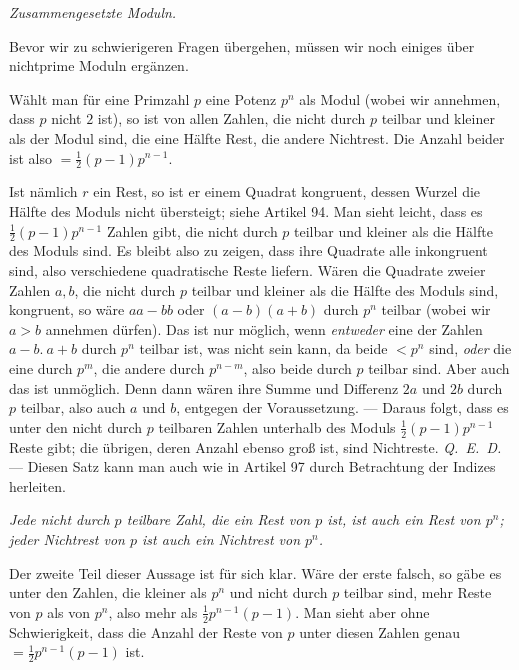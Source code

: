 \begin{center}\small\emph{Zusammengesetzte Moduln.}\end{center}

Bevor wir zu schwierigeren Fragen übergehen, müssen wir noch einiges über nichtprime Moduln ergänzen.

Wählt man für eine Primzahl $p$ eine Potenz $p^n$ als Modul (wobei wir annehmen, dass $p$ nicht $2$ ist), so ist von allen Zahlen, die nicht durch $p$ teilbar und kleiner als der Modul sind, die eine Hälfte Rest, die andere Nichtrest. Die Anzahl beider ist also $=\tfrac12(p-1)p^{n-1}$.

Ist nämlich $r$ ein Rest, so ist er einem Quadrat kongruent, dessen Wurzel die Hälfte des Moduls nicht übersteigt; siehe Artikel 94. Man sieht leicht, dass es $\tfrac12(p-1)p^{n-1}$ Zahlen gibt, die nicht durch $p$ teilbar und kleiner als die Hälfte des Moduls sind. Es bleibt also zu zeigen, dass ihre Quadrate alle inkongruent sind, also verschiedene quadratische Reste liefern. Wären die Quadrate zweier Zahlen $a,b$, die nicht durch $p$ teilbar und kleiner als die Hälfte des Moduls sind, kongruent, so wäre $aa-bb$ oder $(a-b)(a+b)$ durch $p^n$ teilbar (wobei wir $a>b$ annehmen dürfen). Das ist nur möglich, wenn \emph{entweder} eine der Zahlen $a-b.\ a+b$ durch $p^n$ teilbar ist, was nicht sein kann, da beide $<p^n$ sind, \emph{oder} die eine durch $p^m$, die andere durch $p^{n-m}$, also beide durch $p$ teilbar sind. Aber auch das ist unmöglich. Denn dann wären ihre Summe und Differenz $2a$ und $2b$ durch $p$ teilbar, also auch $a$ und $b$, entgegen der Voraussetzung. --- Daraus folgt, dass es unter den nicht durch $p$ teilbaren Zahlen unterhalb des Moduls $\tfrac12(p-1)p^{n-1}$ Reste gibt; die übrigen, deren Anzahl ebenso groß ist, sind Nichtreste. \mbox{\emph{Q. E. D.}} --- Diesen Satz kann man auch wie in Artikel 97 durch Betrachtung der Indizes herleiten.

\emph{Jede nicht durch $p$ teilbare Zahl, die ein Rest von $p$ ist, ist auch ein Rest von $p^n$; jeder Nichtrest von $p$ ist auch ein Nichtrest von $p^n$.}

Der zweite Teil dieser Aussage ist für sich klar. Wäre der erste falsch, so gäbe es unter den Zahlen, die kleiner als $p^n$ und nicht durch $p$ teilbar sind, mehr Reste von $p$ als von $p^n$, also mehr als $\frac{1}{2}p^{n-1}(p-1)$. Man sieht aber ohne Schwierigkeit, dass die Anzahl der Reste von $p$ unter diesen Zahlen genau $=\frac{1}{2}p^{n-1}(p-1)$ ist.

